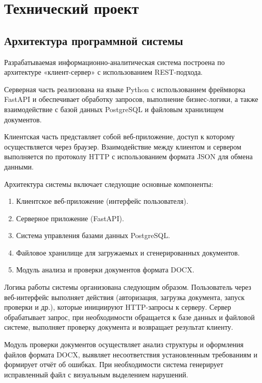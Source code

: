\section{Технический проект}

\subsection{Архитектура программной системы}

Разрабатываемая информационно-аналитическая система построена по архитектуре «клиент-сервер» с использованием REST-подхода.

Серверная часть реализована на языке Python с использованием фреймворка FastAPI и обеспечивает обработку запросов, выполнение бизнес-логики, а также взаимодействие с базой данных PostgreSQL и файловым хранилищем документов.

Клиентская часть представляет собой веб-приложение, доступ к которому осуществляется через браузер. Взаимодействие между клиентом и сервером выполняется по протоколу HTTP с использованием формата JSON для обмена данными.

Архитектура системы включает следующие основные компоненты:

\begin{enumerate}
	\item Клиентское веб-приложение (интерфейс пользователя).
	\item Серверное приложение (FastAPI).
	\item Система управления базами данных PostgreSQL.
	\item Файловое хранилище для загружаемых и сгенерированных документов.
	\item Модуль анализа и проверки документов формата DOCX.
\end{enumerate}

Логика работы системы организована следующим образом. Пользователь через веб-интерфейс выполняет действия (авторизация, загрузка документа, запуск проверки и др.), которые инициируют HTTP-запросы к серверу. Сервер обрабатывает запрос, при необходимости обращается к базе данных и файловой системе, выполняет проверку документа и возвращает результат клиенту.

Модуль проверки документов осуществляет анализ структуры и оформления файлов формата DOCX, выявляет несоответствия установленным требованиям и формирует отчёт об ошибках. При необходимости система генерирует исправленный файл с визуальным выделением нарушений.

